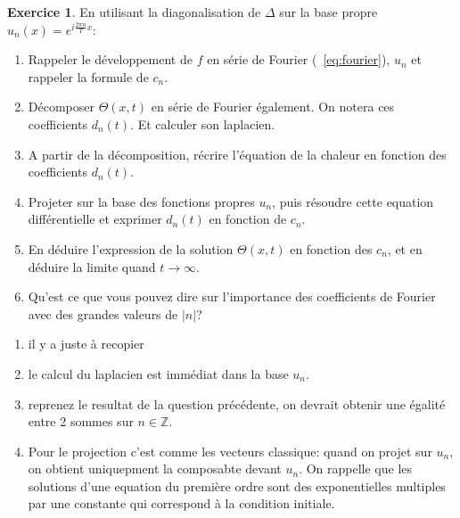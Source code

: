 \documentclass[11pt,a4paper]{article}
\numberwithin{equation}{section}
\theoremstyle{plain}
\theoremstyle{definition}
\newtheorem{exercise}[theorem]{Exercice}
\theoremstyle{remark}
\newcommand{\Z}{\mathbb{Z}}
\newcommand{\Lap}{\Delta}
\begin{document}
\begin{exercise}
    En utilisant la diagonalisation de $\Lap$ sur la base propre $u_n(x)=e^{i\frac{2\pi n}{T}x}$:
    \begin{enumerate}[label=\alph*)]
        \item Rappeler le développement de $f$ en série de Fourier (~\ref{eq:fourier}), $u_n$ et rappeler la formule de $c_n$.
        \item Décomposer $\Theta(x,t)$ en série de Fourier également. On notera ces coefficients $d_n(t)$. Et calculer son laplacien.
        \item A partir de la décomposition, récrire l'équation de la chaleur en fonction des coefficients $d_n(t)$.  
        \item Projeter sur la base des fonctions propres $u_n$, puis résoudre cette equation différentielle et exprimer $d_n(t)$ en fonction de $c_n$.
        \item En déduire l'expression de la solution $\Theta(x,t)$ en fonction des $c_n$, et en déduire la limite quand $t\to\infty$.
        \item Qu'est ce que vous pouvez dire sur l'importance des coefficients de Fourier avec des grandes valeurs de $|n|$?
    \end{enumerate}
\end{exercise}

\begin{indication}
    \begin{enumerate}[label=\alph*)]
        \item il y a juste à recopier
        \item le calcul du laplacien est immédiat dans la base $u_n$.
        \item reprenez le resultat de la question précédente, on devrait obtenir une égalité entre 2 sommes sur $n \in \Z$.
        \item Pour le projection c'est comme les vecteurs classique: quand on projet sur $u_n$, on obtient uniquepment la composabte devant $u_n$.
              On rappelle que les solutions d'une equation du première ordre sont des exponentielles multiples par une constante qui correspond à la condition initiale.
    \end{enumerate}
\end{indication}
\end{document}
